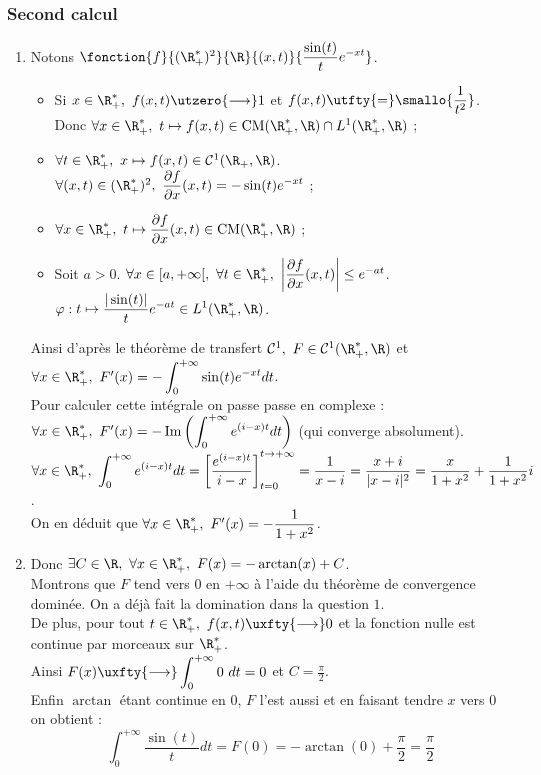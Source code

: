\documentclass{book}
\begin{document}
	\subsubsection{Second calcul }
	\begin{enumerate}[leftmargin=*]
		\item Notons $\fonction{f}{(\R^*_+)^2}{\R}{(x,t)}{\displaystyle\frac{\sin(t)}{t}e^{-xt}}$.\\
		\begin{itemize}
			\item Si $x\in \R^*_+,\ f(x,t)\utzero{\longrightarrow}1$ et $f(x,t)\utfty{=}\smallo{\displaystyle\frac{1}{t^2}}$. Donc $\forall x\in \R^*_+,\ t\mapsto f(x,t)\in \text{CM}(\R^*_+,\R)\cap L^1(\R^*_+,\R)$ ;
			\item $\forall t\in \R^*_+,\ x\mapsto f(x,t)\in \mathcal C^1(\R_+,\R)$. $\forall (x,t)\in (\R^*_+)^2,\ \displaystyle\frac{\partial f}{\partial x}(x,t)=-\sin(t)e^{-xt}$ ;
			\item $\forall x\in \R^*_+,\ t\mapsto\displaystyle\frac{\partial f}{\partial x}(x,t)\in \text{CM}(\R^*_+,\R)$ ;
			\item Soit $a>0$. $\forall x\in [a,+\infty[,\ \forall t\in \R^*_+,\ \left|\displaystyle\frac{\partial f}{\partial x}(x,t)\right|\leq e^{-at}$.\\
			$\varphi:t\mapsto \displaystyle\frac{|\sin(t)|}{t}e^{-at}\in L^1(\R^*_+,\R)$.
		\end{itemize}
		Ainsi d'après le théorème de transfert $\mathcal C^1,\ F\in \mathcal C^1(\R^*_+,\R)$ et $\forall x\in \R^*_+,\ F'(x)=-\displaystyle\int_0^{+\infty}\sin(t)e^{-xt}dt$.\\
		Pour calculer cette intégrale on passe passe en complexe : $\forall x\in \R^*_+,\ F'(x)=-\operatorname{Im}\left(\displaystyle\int_0^{+\infty}e^{(i-x)t}dt\right)$ (qui converge absolument).\\
		$\forall x\in \R^*_+,\ \displaystyle\int_0^{+\infty}e^{(i-x)t}dt=\left[\frac{e^{(i-x)t}}{i-x}\right]_{t=0}^{t\to+\infty}=\frac{1}{x-i}=\frac{x+i}{|x-i|^2}=\frac{x}{1+x^2}+\frac{1}{1+x^2}i$.\\
		On en déduit que $\forall x\in \R^*_+,\ F'(x)=-\displaystyle\frac{1}{1+x^2}$.
		\item Donc $\exists C\in \R,\ \forall x\in \R^*_+,\ F(x)=-\arctan(x)+C$.\\
		Montrons que $F$ tend vers $0$ en $+\infty$ à l'aide du théorème de convergence dominée. On a déjà fait la domination dans la question $1$.\\
		De plus, pour tout $t\in \R^*_+,\ f(x,t)\uxfty{\longrightarrow}0$ et la fonction nulle est continue par morceaux sur $\R^*_+$.\\
		Ainsi $F(x)\uxfty{\longrightarrow}\displaystyle\int_0^{+\infty}0\ dt=0$ et $C=\displaystyle\frac{\pi}{2}$.\\
		Enfin $\arctan$ étant continue en $0$, $F$ l'est aussi et en faisant tendre $x$ vers $0$ on obtient :
		$$\displaystyle\int_0^{+\infty}\frac{\sin(t)}{t}dt=F(0)=-\arctan(0)+\frac{\pi}{2}=\frac{\pi}{2}$$
	\end{enumerate}
	
\end{document}
